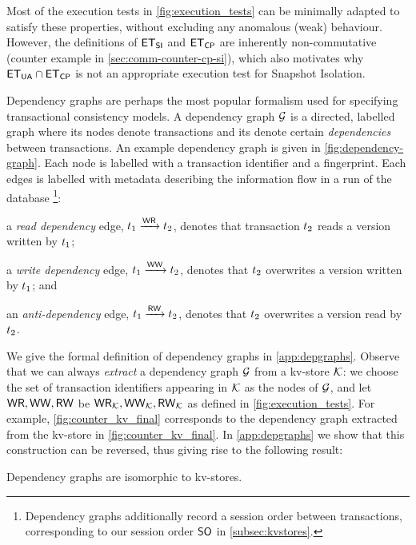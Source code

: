 Most of the execution tests in \cref{fig:execution_tests} can be minimally adapted to satisfy these 
properties, without excluding any anomalous (weak) behaviour. However, the definitions 
of $\mathsf{ET}_{\mathsf{SI}}$ and $\mathsf{ET}_{\mathsf{CP}}$ are inherently non-commutative (counter example in \cref{sec:comm-counter-cp-si}), which also motivates 
why $\mathsf{ET}_{\mathsf{UA}} \cap \mathsf{ET}_{\mathsf{CP}}$ is not an appropriate execution test for Snapshot Isolation.

Dependency graphs \cite{adya-icde,adya} are perhaps the most popular 
formalism used for specifying transactional consistency models. 
A dependency graph $\mathcal{G}$ is a directed, labelled graph where its
nodes denote transactions and its denote certain \emph{dependencies} between transactions.  
An example dependency graph is given in \cref{fig:dependency-graph}.
Each node is labelled with a transaction identifier and a fingerprint.
Each edges is labelled with metadata describing the information flow in a run of the database%
\footnote{Dependency graphs additionally record a session order between transactions, corresponding to our session order $\mathsf{SO}$ in \cref{subsec:kvstores}.}:
\begin{enumerate*}
	\item a \emph{read dependency} edge, $t_1 \xrightarrow{\mathsf{WR}} t_2$, denotes
that transaction $t_2$ reads a version written by $t_1$;
	\item a \emph{write dependency} edge, $t_1 \xrightarrow{\mathsf{WW}} t_2$, denotes that $t_2$ overwrites a version written by $t_1$; and 
	\item an \emph{anti-dependency} edge, $t_1 \xrightarrow{\mathsf{RW}} t_2$, denotes that $t_2$ overwrites a version read by $t_2$. 
\end{enumerate*}
We give the formal definition of dependency graphs in \cref{app:depgraphs}.
Observe that we can always \emph{extract} a dependency graph  $\mathcal{G}$ from a kv-store $\mathcal{K}$:
we choose the set of transaction identifiers appearing in $\mathcal{K}$ as the nodes of $\mathcal{G}$, 
and let $\mathsf{WR}, \mathsf{WW}, \mathsf{RW}$ be $\mathsf{WR}_{\mathcal{K}}, \mathsf{WW}_{\mathcal{K}}, \mathsf{RW}_{\mathcal{K}}$ as defined in \cref{fig:execution_tests}.
For example, \cref{fig:counter_kv_final} corresponds to the dependency graph extracted from the kv-store in \cref{fig:counter_kv_final}.
In \cref{app:depgraphs} we show that this construction can be reversed, thus giving 
rise to the following result: 
\begin{theorem}
\label{thm:kv_graph_isomorph}
Dependency graphs are isomorphic to kv-stores.
\end{theorem}

